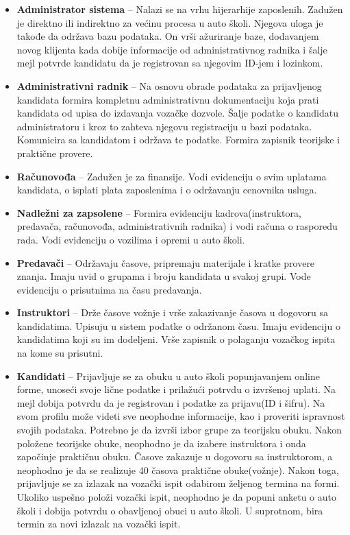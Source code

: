 \begin{itemize}
\item \textbf{Administrator sistema} – Nalazi se na vrhu hijerarhije zaposlenih. Zadužen je direktno ili indirektno za većinu procesa u auto školi. Njegova uloga je takođe da održava bazu podataka. On vrši ažuriranje baze, dodavanjem novog klijenta kada dobije informacije od administrativnog radnika i šalje mejl potvrde kandidatu da je registrovan sa njegovim ID-jem i lozinkom.
\item \textbf{Administrativni radnik} – Na osnovu obrade podataka za prijavljenog kandidata formira kompletnu administrativnu dokumentaciju koja prati kandidata od upisa do izdavanja vozačke dozvole. Šalje podatke o kandidatu administratoru i kroz to zahteva njegovu registraciju u bazi podataka. Komunicira sa kandidatom i održava te podatke. Formira zapisnik teorijske i praktične provere.
\item \textbf{Računovođa} – Zadužen je za finansije. Vodi evidenciju o svim uplatama kandidata, o isplati plata zaposlenima i o održavanju cenovnika usluga.
\item \textbf{Nadležni za zapsolene} – Formira evidenciju kadrova(instruktora, predavača, računovođa, administrativnih radnika) i vodi računa o rasporedu rada. Vodi evidenciju o vozilima i opremi u auto školi.
\item \textbf{Predavači} – Održavaju časove, pripremaju materijale i kratke provere znanja. Imaju uvid o grupama i broju kandidata u svakoj grupi. Vode evidenciju o prisutnima na času predavanja.
\item \textbf{Instruktori} – Drže časove vožnje i vrše zakazivanje časova u dogovoru sa kandidatima. Upisuju u sistem podatke o održanom času. Imaju evidenciju o kandidatima koji su im dodeljeni. Vrše zapisnik o polaganju vozačkog ispita na kome su prisutni.
\item \textbf{Kandidati} – Prijavljuje se za obuku u auto školi  popunjavanjem online forme, unoseći svoje lične podatke i prilažući potrvdu o izvršenoj uplati. Na mejl dobija potvrdu da je registrovan i podatke za prijavu(ID i šifru). Na svom profilu može videti sve neophodne informacije, kao i proveriti ispravnost svojih podataka. Potrebno je da izvrši izbor grupe za teorijsku obuku. Nakon položene teorijske obuke, neophodno je da izabere instruktora i onda započinje praktičnu obuku. Časove zakazuje u dogovoru sa instruktorom, a neophodno je da se realizuje 40 časova praktične obuke(vožnje). Nakon toga, prijavljuje se za izlazak na vozački ispit odabirom željenog termina na formi. Ukoliko uspešno položi vozački ispit, neophodno je da popuni anketu o auto školi i dobija potvrdu o obavljenoj obuci u auto školi. U suprotnom, bira termin za novi izlazak na vozački ispit. 
\end{itemize}


